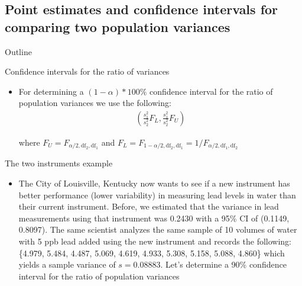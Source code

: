 \documentclass[xcolor=dvipsnames]{beamer}
\begin{document}
\subsection{Point estimates and confidence intervals for comparing two population variances}
\begin{frame}{Outline}
	\tableofcontents[currentsection,subsectionstyle=show/shaded/hide]
\end{frame}

\begin{frame}{Confidence intervals for the ratio of variances}
	\begin{itemize}
		\item For determining a $(1-\alpha)*100 \%$ confidence interval for the ratio of population variances we use the following:  \pause
		\begin{gather*}
			\left(\frac{s_1^2}{s_2^2} F_L, \frac{s_1^2}{s_2^2} F_U \right)
		\end{gather*}
					
		where $F_U = F_{\alpha / 2, \text{df}_2, \text{df}_1}$ and $F_L = F_{1-\alpha / 2, \text{df}_2, \text{df}_1} = 1 / F_{\alpha / 2, \text{df}_1, \text{df}_2}$
	\end{itemize}
\end{frame}

\begin{frame}{The two instruments example}
	\begin{itemize}
			\item The City of Louisville, Kentucky now wants to see if a new instrument has better performance (lower variability) in measuring lead levels in water than their current instrument. Before, we estimated that the variance in lead measurements using that instrument was 0.2430 with a 95\% CI of (0.1149, 0.8097). The same scientist analyzes the same sample of 10 volumes of water with 5 ppb lead added using the new instrument and records the following: \{4.979, 5.484, 4.487, 5.069, 4.619, 4.933, 5.308, 5.158, 5.088, 4.860\} which yields a sample variance of $s = 0.08883$. Let's determine a 90\% confidence interval for the ratio of population variances
	\end{itemize}
\end{frame}
\end{document}
